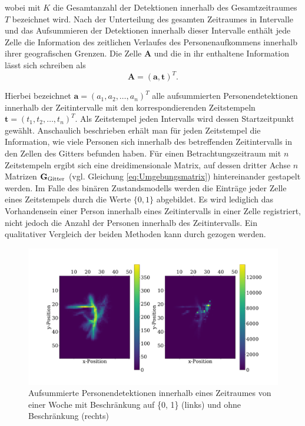 wobei mit $K$ die Gesamtanzahl der Detektionen innerhalb des Gesamtzeitraumes $T$ bezeichnet wird.
Nach der Unterteilung des gesamten Zeitraumes in Intervalle und das Aufsummieren der Detektionen innerhalb dieser Intervalle enthält jede Zelle die Information des zeitlichen Verlaufes des Personenaufkommens innerhalb ihrer geografischen Grenzen. Die Zelle $\boldsymbol{A}$ und die in ihr enthaltene Information lässt sich schreiben als
\begin{equation}
	\boldsymbol{A} = (\boldsymbol{a}, \boldsymbol{t})^T .
	\label{eq:Vereinfachte Zellengleichung}
\end{equation}

Hierbei bezeichnet $\boldsymbol{a} = (a_1, a_2, \dots ,a_n)^T$ alle aufsummierten Personendetektionen innerhalb der Zeitintervalle mit den korrespondierenden Zeitstempeln $\boldsymbol{t} = (t_1, t_2, \dots ,t_n)^T$. Als Zeitstempel jeden Intervalls wird dessen Startzeitpunkt gewählt. Anschaulich beschrieben erhält man für jeden Zeitstempel die Information, wie viele Personen sich innerhalb des betreffenden Zeitintervalls in den Zellen des Gitters befunden haben. Für einen Betrachtungszeitraum mit $n$ Zeitstempeln ergibt sich eine dreidimensionale Matrix, auf dessen dritter Achse $n$ Matrizen $\mathbf{G}_{\mathrm{Gitter}}$ (vgl. Gleichung \ref{eq:Umgebungsmatrix}) hintereinander gestapelt werden. Im Falle des binären Zustandsmodells werden die Einträge jeder Zelle eines Zeitstempels durch die Werte $\{0,1\}$ abgebildet. Es wird lediglich das Vorhandensein einer Person innerhalb eines Zeitintervalls in einer Zelle registriert, nicht jedoch die Anzahl der Personen innerhalb des Zeitintervalls.
Ein qualitativer Vergleich der beiden Methoden kann durch  gezogen werden.

\begin{figure}[!h]
	\begin{center}
		\centering
		\includegraphics[width=1.0\linewidth]{Abbildungen/methodik/occupancy_grid_vergleich}
		\caption[Vergleich Personendetektion binärer und quantitativer Fall]{Aufsummierte Personendetektionen innerhalb eines Zeitraumes von einer Woche mit Beschränkung auf \{0, 1\} (links) und ohne Beschränkung (rechts)}
		\label{fig.occupancy_grid_vergleich}
	\end{center}
\end{figure}

